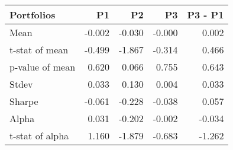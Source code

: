 \begin{tabular}{lrrrr}
\toprule
Portfolios & P1 & P2 & P3 & P3 - P1 \\
\midrule
Mean & -0.002 & -0.030 & -0.000 & 0.002 \\
t-stat of mean & -0.499 & -1.867 & -0.314 & 0.466 \\
p-value of mean & 0.620 & 0.066 & 0.755 & 0.643 \\
Stdev & 0.033 & 0.130 & 0.004 & 0.033 \\
Sharpe & -0.061 & -0.228 & -0.038 & 0.057 \\
Alpha & 0.031 & -0.202 & -0.002 & -0.034 \\
t-stat of alpha & 1.160 & -1.879 & -0.683 & -1.262 \\
\bottomrule
\end{tabular}
